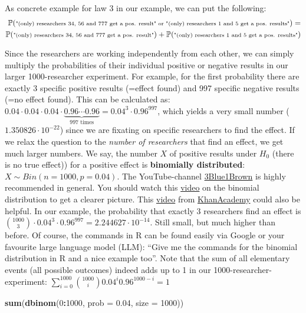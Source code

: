 \documentclass[
]{book}
\newenvironment{Shaded}{\begin{snugshade}}{\end{snugshade}}
\newcommand{\AttributeTok}[1]{\textcolor[rgb]{0.13,0.29,0.53}{#1}}
\newcommand{\DecValTok}[1]{\textcolor[rgb]{0.00,0.00,0.81}{#1}}
\newcommand{\FloatTok}[1]{\textcolor[rgb]{0.00,0.00,0.81}{#1}}
\newcommand{\FunctionTok}[1]{\textcolor[rgb]{0.13,0.29,0.53}{\textbf{#1}}}
\newcommand{\NormalTok}[1]{#1}
\newcommand{\SpecialCharTok}[1]{\textcolor[rgb]{0.81,0.36,0.00}{\textbf{#1}}}
\begin{document}
As concrete example for law 3 in our example, we can put the following:
\begin{align}
\scriptsize \mathbb{P}(\text{"(only) researchers 34, 56 and 777 get a pos. result" or "(only) researchers 1 and 5 get a pos. results"}) =\\
\scriptsize \mathbb{P}(\text{"(only) researchers 34, 56 and 777 get a pos. result"}) + \mathbb{P}(\text{"(only) researchers 1 and 5 get a pos. results"})
\end{align}

Since the researchers are working independently from each other, we can simply multiply the probabilities of their individual positive or negative results in
our larger 1000-researcher experiment. For example, for the first probability there are exactly 3 specific positive
results (=effect found) and 997 specific negative results (=no effect found).
This can be calculated as:
\(0.04 \cdot 0.04 \cdot 0.04 \cdot \underbrace{0.96 \cdots 0.96}_{\text{997 times}} = 0.04^3 \cdot 0.96^{997}\), which yields a very small number (\(1.350826 \cdot 10^{-22}\))
since we are fixating on specific researchers to find the effect.
If we relax the question to the \emph{number of researchers} that find an effect,
we get much larger numbers. We say, the number \(X\) of positive results under \(H_0\) (there is no true effect)) for a positive effect is \textbf{binomially distributed}: \(X \sim Bin(n=1000, p=0.04)\).
The YouTube-channel \href{https://www.youtube.com/@3blue1brown}{3Blue1Brown} is highly recommended in general. You should watch this
\href{https://www.youtube.com/watch?v=8idr1WZ1A7Q&ab_channel=3Blue1Brown}{video} on the binomial distribution to get a clearer picture.
This \href{https://www.youtube.com/watch?v=WWv0RUxDfbs&ab_channel=KhanAcademy}{video} from \href{https://www.youtube.com/@khanacademy}{KhanAcademy} could also be helpful.
In our example, the probability that exactly 3 researchers find an effect is \(\binom{1000}{3} \cdot 0.04^3 \cdot 0.96^{997} = 2.244627 \cdot 10^{-14}\).
Still small, but much higher than before. Of course, the commands in R can be found easily via Google or your favourite large language model (LLM):
``Give me the commands for the binomial distribution in R and a nice example too''.
Note that the sum of all elementary events (all possible outcomes) indeed adds up to 1 in our 1000-researcher-experiment: \(\sum_{i=0}^{1000} \binom{1000}{i}0.04^i 0.96^{1000-i} = 1\)

\begin{Shaded}
\begin{Highlighting}[]
\FunctionTok{sum}\NormalTok{(}\FunctionTok{dbinom}\NormalTok{(}\DecValTok{0}\SpecialCharTok{:}\DecValTok{1000}\NormalTok{, }\AttributeTok{prob =} \FloatTok{0.04}\NormalTok{, }\AttributeTok{size =} \DecValTok{1000}\NormalTok{))}
\end{Highlighting}
\end{Shaded}
\end{document}
